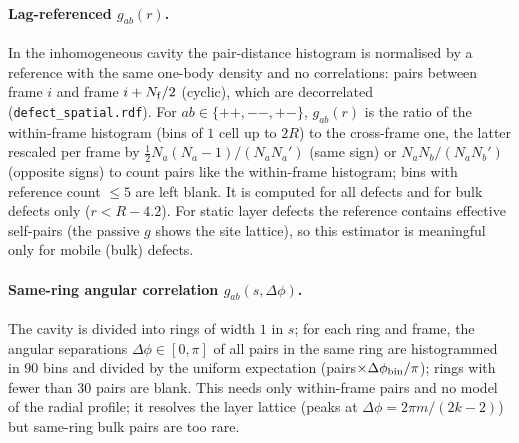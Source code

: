 \paragraph{Lag-referenced $g_{ab}(r)$.}
In the inhomogeneous cavity the pair-distance histogram is normalised by a reference with the same one-body
density and no correlations: pairs between frame $i$ and frame $i+N_{\rm f}/2$ (cyclic), which are
decorrelated (\texttt{defect\_spatial.rdf}). For $ab\in\{++,--,+-\}$, $g_{ab}(r)$ is the ratio of the
within-frame histogram (bins of $1$ cell up to $2R$) to the cross-frame one, the latter rescaled per frame by
$\tfrac12N_a(N_a-1)/(N_aN_a')$ (same sign) or $N_aN_b/(N_aN_b')$ (opposite signs) to count pairs like the
within-frame histogram; bins with reference count $\le5$ are left blank. It is computed for all defects and
for bulk defects only ($r<R-4.2$). For static layer defects the reference contains effective self-pairs
(the passive $g$ shows the site lattice), so this estimator is meaningful only for mobile (bulk) defects.

\paragraph{Same-ring angular correlation $g_{ab}(s,\Delta\phi)$.}
The cavity is divided into rings of width $1$ in $s$; for each ring and frame, the angular separations
$\Delta\phi\in[0,\pi]$ of all pairs in the same ring are histogrammed in $90$ bins and divided by the uniform
expectation (pairs$\times\Delta\phi_{\rm bin}/\pi$); rings with fewer than $30$ pairs are blank. This needs only
within-frame pairs and no model of the radial profile; it resolves the layer lattice (peaks at
$\Delta\phi=2\pi m/(2k-2)$) but same-ring bulk pairs are too rare.

